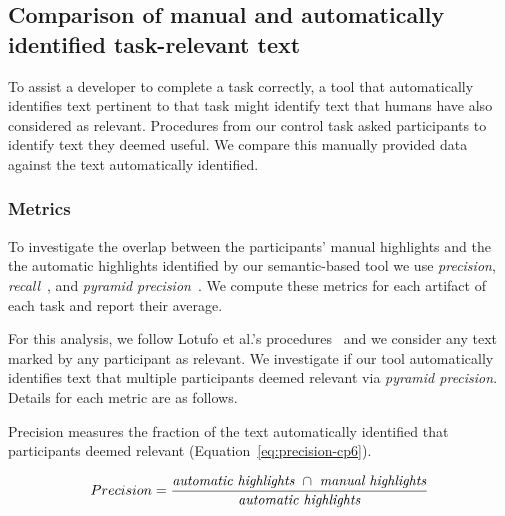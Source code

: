 
\subsection{Comparison of manual and automatically identified task-relevant text}
\label{cp6:comparison}



To assist a developer to complete a task correctly, a tool that
automatically identifies text pertinent to that task might 
identify text that humans have also considered as relevant.
Procedures from our control task asked participants to identify text they deemed useful. We
 compare this manually provided data against the text automatically identified.




\subsubsection{Metrics}

To investigate the overlap between the participants' manual highlights and the 
the automatic highlights identified by our semantic-based tool we use \textit{precision}, 
\textit{recall}~\cite{manning2010IR}, and \textit{pyramid precision}~\cite{Nenkova2004}.
We compute these metrics for each artifact of each task and report their average.


For this analysis, we follow Lotufo et al.'s procedures~\cite{Lotufo2012} and we consider any text marked by any participant as relevant.
We investigate if our tool  automatically identifies text that multiple participants deemed relevant
 via \textit{pyramid precision}. 
Details for each metric are as follows. 

\medskip

Precision measures the fraction of the text automatically identified  that participants deemed relevant (Equation~\ref{eq:precision-cp6}). 

\smallskip
\begin{small}
\begin{equation}
    Precision = \frac{
        \text{\textit{automatic highlights}~} \cap 
        \text{~\textit{manual highlights}}
    }{\text{\textit{automatic highlights}}}
\label{eq:precision-cp6}    
\end{equation}
\end{small}


